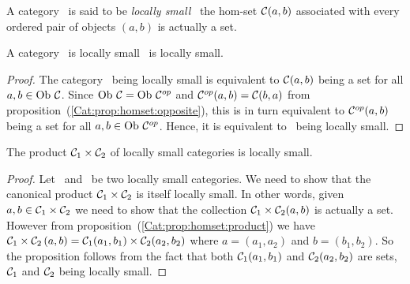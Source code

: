 \begin{defin}\label{Cat:def:locally:small}
    A category \Cat\ is said to be {\em locally small} \ifand\ the hom-set
    $\mbox{$\cal C$}(a,b)$ associated with every ordered pair of objects $(a,b)$ is 
    actually a set.
\end{defin}

\begin{prop}\label{Cat:prop:locally:small:opposite}
    A category \Cat\ is locally small \ifand\ \Cop is locally small.
\end{prop}
\begin{proof}
    The category \Cat\ being locally small is equivalent to $\mbox{$\cal C$}(a,b)$
    being a set for all $a,b\in\mbox{\rm Ob}\ \mbox{$\cal C$}$. Since $\mbox{\rm Ob}\ \mbox{$\cal C$}=\mbox{\rm Ob}\ \mbox{${\cal C}^{op}$}$
    and $\mbox{${\cal C}^{op}$}(a,b)=\mbox{$\cal C$}(b,a)$ from 
    proposition~(\ref{Cat:prop:homset:opposite}), this is in turn equivalent 
    to $\mbox{${\cal C}^{op}$}(a,b)$ being a set for all $a,b\in\mbox{\rm Ob}\ \mbox{${\cal C}^{op}$}$. Hence, it is
    equivalent to \Cop\ being locally small.
\end{proof}

\begin{prop}\label{Cat:prop:locally:small:product}
    The product $\mbox{${\cal C}_{1}$}\times\mbox{${\cal C}_{2}$}$ of locally small categories
    is locally small.
\end{prop}
\begin{proof}
    Let \Cone\ and \Ctwo\ be two locally small categories. We need to show that
    the canonical product $\mbox{${\cal C}_{1}$}\times\mbox{${\cal C}_{2}$}$ is itself locally small. In other
    words, given $a,b\in\mbox{${\cal C}_{1}$}\times\mbox{${\cal C}_{2}$}$ we need to show that the collection
    $\mbox{${\cal C}_{1}$}\times\mbox{${\cal C}_{2}$}(a,b)$ is actually a set. However from 
    proposition~(\ref{Cat:prop:homset:product}) we have 
    $\mbox{${\cal C}_{1}$}\times\mbox{${\cal C}_{2}$}\,(a,b)=\mbox{${\cal C}_{1}$}(a_{1},b_{1})\times\mbox{${\cal C}_{2}$}(a_{2},b_{2})$
    where $a=(a_{1},a_{2})$ and $b=(b_{1},b_{2})$. So the proposition
    follows from the fact that both $\mbox{${\cal C}_{1}$}(a_{1},b_{1})$ and 
    $\mbox{${\cal C}_{2}$}(a_{2},b_{2})$ are sets, $\mbox{${\cal C}_{1}$}$ and $\mbox{${\cal C}_{2}$}$ being locally 
    small.
\end{proof}
